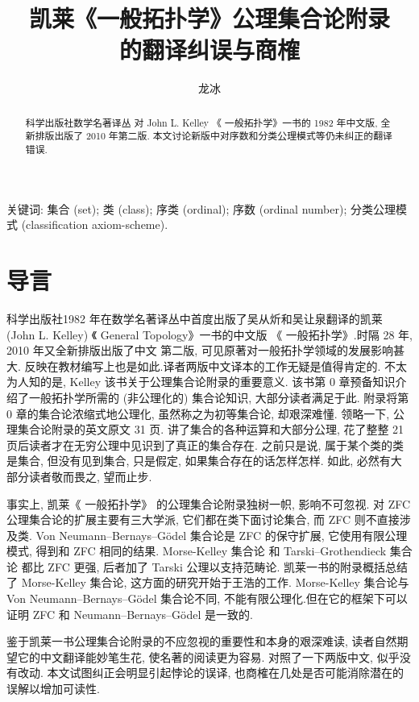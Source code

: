 \documentclass[zihao=-4,a4paper]{ctexart}
\title{凯莱《一般拓扑学》公理集合论附录\\ 的翻译纠误与商榷}
\author{龙\quad 冰}
\date{}
\begin{document}
\maketitle
\begin{abstract}
科学出版社数学名著译丛 对 John L. Kelley 《 一般拓扑学》一书的 1982 年中文版, 全新排版出版了 2010 年第二版.
本文讨论新版中对序数和分类公理模式等仍未纠正的翻译错误.
\end{abstract}
	
关键词: 集合 (set); 类 (class); 序类 (ordinal); 
	序数 (ordinal number); 
	分类公理模式 (classification axiom-scheme).
	
	
	
\section{导言}
科学出版社1982 年在数学名著译丛中首度出版了吴从炘和吴让泉翻译的凯莱  (John L. Kelley) 《 General  Topology》\cite{jkelley1975}一书的中文版 《 一般拓扑学》.时隔 28 年, 2010 年又全新排版出版了中文 第二版\cite{jkelley2010zh}, 可见原著对一般拓扑学领域的发展影响甚大. 反映在教材编写上也是如此\cite{PuJiangHu1985}.译者两版中文译本的工作无疑是值得肯定的. 不太为人知的是, Kelley 该书关于公理集合论附录的重要意义. 该书第 0 章预备知识介绍了一般拓扑学所需的 (非公理化的) 集合论知识, 大部分读者满足于此. 
附录将第 0 章的集合论浓缩式地公理化, 虽然称之为初等集合论, 却艰深难懂. 领略一下, 公理集合论附录的英文原文 31 页. 讲了集合的各种运算和大部分公理, 花了整整 21 页后读者才在无穷公理中见识到了真正的集合存在. 之前只是说, 属于某个类的类是集合, 但没有见到集合, 只是假定, 如果集合存在的话怎样怎样. 如此, 必然有大部分读者敬而畏之, 望而止步. 

事实上, 凯莱《 一般拓扑学》 的公理集合论附录独树一帜, 影响不可忽视. 对 ZFC 公理集合论\cite{jjiang1991}\cite{enderton1977}的扩展主要有三大学派\cite{wikiSetTheory}, 它们都在类下面讨论集合, 而 ZFC 则不直接涉及类. Von Neumann–Bernays–Gödel 集合论\cite{wikiNBGSetTheory}是 ZFC 的保守扩展,  它使用有限公理模式, 得到和 ZFC 相同的结果. 
Morse-Kelley 集合论\cite{wikiMKSetTheory} 和 Tarski–Grothendieck 集合论\cite{wikiTGSetTheory} 都比 ZFC 更强, 后者加了 Tarski 公理以支持范畴论. 凯莱一书的附录概括总结了 Morse-Kelley 集合论,
这方面的研究开始于王浩的工作\cite{wang1949}. Morse-Kelley 集合论与 Von Neumann–Bernays–Gödel  集合论不同, 不能有限公理化.但在它的框架下可以证明 ZFC 和 Neumann–Bernays–Gödel 是一致的.

鉴于凯莱一书公理集合论附录的不应忽视的重要性和本身的艰深难读, 读者自然期望它的中文翻译能妙笔生花, 使名著的阅读更为容易. 对照了一下两版中文, 似乎没有改动. 本文试图纠正会明显引起悖论的误译, 也商榷在几处是否可能消除潜在的误解以增加可读性.
	
\end{document}
